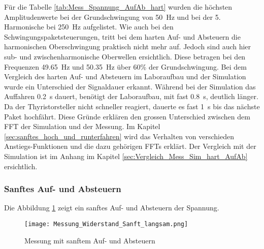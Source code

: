 Für die Tabelle \ref{tab:Mess_Spannung_AufAb_hart} wurden die höchsten Amplitudenwerte bei der Grundschwingung von \SI{50}{Hz} und bei der 5. Harmonische bei \SI{250}{Hz} aufgelistet.
Wie auch bei den Schwingungspaketsteuerungen, tritt bei dem harten Auf- und Absteuern die harmonischen Oberschwingung praktisch nicht mehr auf. Jedoch sind auch hier sub- und zwischenharmonische Oberwellen ersichtlich. Diese betragen bei den Frequenzen \SI{49.65}{Hz} und \SI{50.35}{Hz} über 60\% der Grundschwingung. Bei dem Vergleich des harten Auf- und Absteuern im Laboraufbau und der Simulation wurde ein Unterschied der Signaldauer erkannt. Während bei der Simulation das Auffahren \SI{0.2}{s} dauert, benötigt der Laboraufbau, mit fast \SI{0.8}{s}, deutlich länger. Da der Thyristorsteller nicht schneller reagiert, dauerte es fast \SI{1}{s} bis das nächste Paket hochfährt. Diese Gründe erklären den grossen Unterschied zwischen dem FFT der Simulation und der Messung. Im Kapitel \ref{sec:sanftes_hoch_und_runterfahren} wird das Verhalten von verschieden Anstiegs-Funktionen und die dazu gehörigen FFTs erklärt. Der Vergleich mit der Simulation ist im Anhang im Kapitel \ref{sec:Vergleich_Mess_Sim_hart_AufAb} ersichtlich. 

\newpage
\subsubsection*{Sanftes Auf- und Absteuern}
Die Abbildung \ref{fig:Mess_Sanft_langsam} zeigt ein sanftes Auf- und Absteuern der Spannung.


\begin{figure}[ht!]
	\centering
	\texttt{[image: Messung\_Widerstand\_Sanft\_langsam.png]}	
	\caption{Messung mit sanftem Auf- und Absteuern}\label{fig:Mess_Sanft_langsam}
\end{figure}



